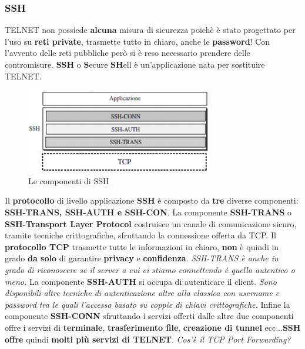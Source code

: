 \documentclass[11pt,a4paper]{article}
\theoremstyle{definition}
\begin{document}
\subsubsection{SSH}
TELNET non possiede \textbf{alcuna} misura di sicurezza poichè è stato progettato per l'uso su \textbf{reti private}, trasmette tutto in chiaro, anche le \textbf{password}! Con l'avvento delle reti pubbliche però si è reso necessario prendere delle contromisure. \newline
\textbf{SSH} o \textbf{S}ecure \textbf{SH}ell è un'applicazione nata per sostituire TELNET.
\begin{figure}[!h]
	\includegraphics[scale=0.7]{Immagini/SSH.png}
	\centering
	\caption{Le componenti di SSH}
\end{figure}\newline
Il \textbf{protocollo} di livello applicazione \textbf{SSH} è composto da \textbf{tre} diverse componenti: \textbf{SSH-TRANS, SSH-AUTH e SSH-CON}. La componente \textbf{SSH-TRANS} o \textbf{SSH-Transport Layer Protocol} costruisce un canale di comunicazione sicuro, tramite tecniche crittografiche, sfruttando la connessione offerta da TCP. Il \textbf{protocollo TCP} trasmette tutte le informazioni in chiaro, \textbf{non} è quindi in grado \textbf{da solo} di garantire \textbf{privacy} e \textbf{confidenza}. \textit{SSH-TRANS è anche in grado di riconoscere se il server a cui ci stiamo connettendo è quello autentico o meno.} La componente \textbf{SSH-AUTH} si occupa di autenticare il client. \textit{Sono disponibili altre tecniche di autenticazione oltre alla classica con username e password tra le quali l'accesso basato su coppie di chiavi crittografiche.} Infine la componente \textbf{SSH-CONN} sfruttando i servizi offerti dalle altre due componenti offre i servizi di \textbf{terminale}, \textbf{trasferimento file}, \textbf{creazione di tunnel} ecc...\newline \textbf{SSH offre} quindi \textbf{molti più servizi di TELNET}.\newline\newline
\textit{Cos'è il TCP Port Forwarding?}\newline\newline
\end{document}
